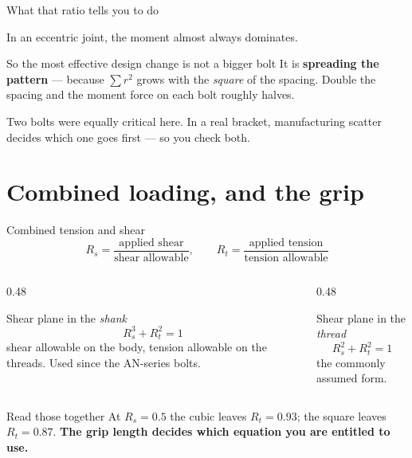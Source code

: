\documentclass[aspectratio=169,10pt]{beamer}
\begin{document}
\begin{frame}{What that ratio tells you to do}
\begin{center}\Large
In an eccentric joint, the \alert{moment almost always dominates}.
\end{center}
\vfill
\begin{alertblock}{So the most effective design change is not a bigger bolt}
It is \textbf{spreading the pattern} --- because $\sum r^2$ grows with the \emph{square} of the
spacing.
\vspace{3pt}
Double the spacing and the moment force on each bolt roughly halves.
\end{alertblock}
\vfill
\centering
Two bolts were equally critical here. In a real bracket, manufacturing scatter decides which one
goes first --- so you check both.
\end{frame}

\section{Combined loading, and the grip}

\begin{frame}{Combined tension and shear}
\[
R_s=\frac{\text{applied shear}}{\text{shear allowable}},
\qquad
R_t=\frac{\text{applied tension}}{\text{tension allowable}}
\]
\vfill
\begin{columns}[T]
\begin{column}{0.48\textwidth}
\begin{block}{Shear plane in the \emph{shank}}
\[ R_s^{3}+R_t^{2}=1 \]
{\footnotesize shear allowable on the body, tension allowable on the threads. Used since the
AN-series bolts.}
\end{block}
\end{column}
\begin{column}{0.48\textwidth}
\begin{block}{Shear plane in the \emph{thread}}
\[ R_s^{2}+R_t^{2}=1 \]
{\footnotesize the commonly assumed form.}
\end{block}
\end{column}
\end{columns}
\vfill
\begin{alertblock}{Read those together}
At $R_s=0.5$ the cubic leaves $R_t=0.93$; the square leaves $R_t=0.87$. \textbf{The grip length
decides which equation you are entitled to use.}
\end{alertblock}
\end{frame}
\end{document}
